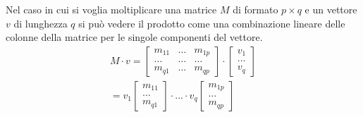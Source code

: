 Nel caso in cui si voglia moltiplicare una matrice $M$ di formato $p \times q$ e un
vettore $v$ di lunghezza $q$ si pu\`o vedere il prodotto come una combinazione lineare
delle colonne della matrice per le singole componenti del vettore.
\begin{gather*}
	M \cdot v =
	\begin{bmatrix}
		m_{11} & \dots & m_{1p} \\
		\dots  & \dots & \dots  \\
		m_{q1} & \dots & m_{qp}
	\end{bmatrix} \cdot
	\begin{bmatrix}
		v_1 \\ \dots \\ v_q
	\end{bmatrix} \\
	= v_1 \begin{bmatrix}
		m_{11} \\ \dots \\ m_{q1}
	\end{bmatrix} \cdot
	... \cdot
	v_q \begin{bmatrix}
		m_{1p} \\ \dots \\ m_{qp}
	\end{bmatrix}
\end{gather*}